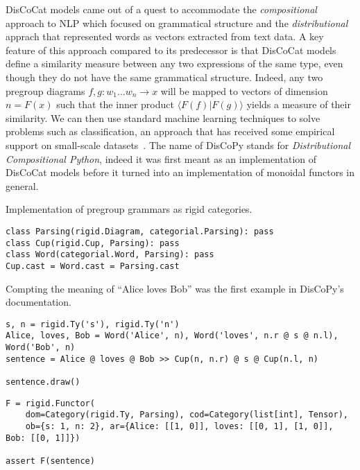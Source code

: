 DisCoCat models came out of a quest to accommodate the \emph{compositional} approach to NLP which focused on grammatical structure and the \emph{distributional} apprach that represented words as vectors extracted from text data.
A key feature of this approach compared to its predecessor is that DisCoCat models define a similarity measure between any two expressions of the same type, even though they do not have the same grammatical structure.
Indeed, any two pregroup diagrams $f, g : w_1 \dots w_n \to x$ will be mapped to vectors of dimension $n = F(x)$ such that the inner product $\langle F(f) \vert F(g) \rangle$ yields a measure of their similarity.
We can then use standard machine learning techniques to solve problems such as classification, an approach that has received some empirical support on small-scale datasets~\cite{GrefenstetteSadrzadeh11}.
The name of DisCoPy stands for \emph{Distributional Compositional Python}, indeed it was first meant as an implementation of DisCoCat models before it turned into an implementation of monoidal functors in general.

\begin{python}
{\normalfont Implementation of pregroup grammars as rigid categories.}

\begin{verbatim}
class Parsing(rigid.Diagram, categorial.Parsing): pass
class Cup(rigid.Cup, Parsing): pass
class Word(categorial.Word, Parsing): pass
Cup.cast = Word.cast = Parsing.cast
\end{verbatim}
\end{python}

\begin{example}\label{example:alice-loves-bob}
Compting the meaning of ``Alice loves Bob'' was the first example in DisCoPy's documentation.

\begin{verbatim}
s, n = rigid.Ty('s'), rigid.Ty('n')
Alice, loves, Bob = Word('Alice', n), Word('loves', n.r @ s @ n.l), Word('Bob', n)
sentence = Alice @ loves @ Bob >> Cup(n, n.r) @ s @ Cup(n.l, n)

sentence.draw()
\end{verbatim}


\begin{verbatim}
F = rigid.Functor(
    dom=Category(rigid.Ty, Parsing), cod=Category(list[int], Tensor),
    ob={s: 1, n: 2}, ar={Alice: [[1, 0]], loves: [[0, 1], [1, 0]], Bob: [[0, 1]]})

assert F(sentence)
\end{verbatim}
\end{example}
